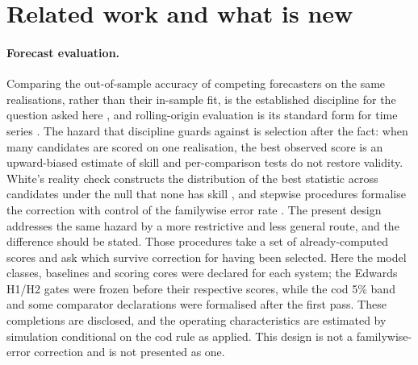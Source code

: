 \FloatBarrier
\section{Related work and what is new}\label{sec:related}

\paragraph{Forecast evaluation.} Comparing the out-of-sample accuracy of competing forecasters on the same realisations, rather than their in-sample fit, is the established discipline for the question asked here \citep{Diebold1995,HyndmanKoehler2006,HyndmanAthanasopoulos2021}, and rolling-origin evaluation is its standard form for time series \citep{Tashman2000,Bergmeir2012}. The hazard that discipline guards against is selection after the fact: when many candidates are scored on one realisation, the best observed score is an upward-biased estimate of skill and per-comparison tests do not restore validity. White's reality check constructs the distribution of the best statistic across candidates under the null that none has skill \citep{White2000}, and stepwise procedures formalise the correction with control of the familywise error rate \citep{RomanoWolf2005}. The present design addresses the same hazard by a more restrictive and less general route, and the difference should be stated. Those procedures take a set of already-computed scores and ask which survive correction for having been selected. Here the model classes, baselines and scoring cores were declared for each system; the Edwards H1/H2 gates were frozen before their respective scores, while the cod 5\% band and some comparator declarations were formalised after the first pass. These completions are disclosed, and the operating characteristics are estimated by simulation conditional on the cod rule as applied. This design is not a familywise-error correction and is not presented as one.

